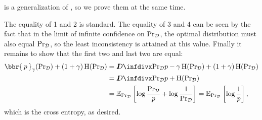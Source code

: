 \begin{subappendices}
 is a generalization of , so we prove them at the same time.
\begin{lproof} \label{proof:many-equal-simple}\label{proof:expected-surprise}
	The equality of 1 and 2 is standard. The equality of 3 and 4 can be seen by the fact that in the limit of infinite confidence on $\Pr\nolimits_{{\mathcal D}}$, the optimal distribution must also equal $\Pr\nolimits_{{\mathcal D}}$, so the least inconsistency is attained at this value.
	Finally it remains to show that the first two and last two are equal:
	\begin{align*}
		\bbr{\,p\,}_\gamma(\datadist\xsamp) + (1+\gamma)\H(\datadist\xsamp)
		&=  \kldiv{\datadist\xsamp}{p} - \gamma \H(\datadist\xsamp)+ (1+\gamma)\H(\datadist\xsamp) \\
		&= \kldiv{\datadist\xsamp}{p} + \H(\datadist\xsamp) \\
		&= \Ex\nolimits_{\datadist\xsamp}\left[\log\frac{\datadist\xsamp}{p} +  \log\frac{1}{\datadist\xsamp}\right]
		= \Ex\nolimits_{\datadist\xsamp}\left[\log\frac{1}{p}\right],
	\end{align*}
	which is the cross entropy, as desired.
\end{lproof}



\end{subappendices}
